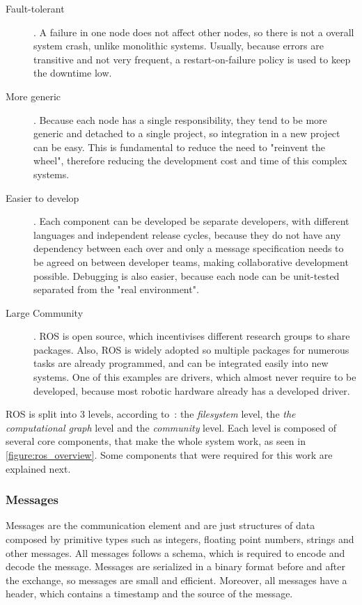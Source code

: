 \begin{description}
    \item[Fault-tolerant]. A failure in one node does not affect other nodes, so there is not a overall system crash, unlike monolithic systems. Usually, because errors are transitive and not very frequent, a restart-on-failure policy is used to keep the downtime low.
    \item[More generic]. Because each node has a single responsibility, they tend to be more generic and detached to a single project, so integration in a new project can be easy. This is fundamental to reduce the need to "reinvent the wheel", therefore reducing the development cost and time of this complex systems.
    \item[Easier to develop]. Each component can be developed be separate developers, with different languages and independent release cycles, because they do not have any dependency between each over and only a message specification needs to be agreed on between developer teams, making collaborative development possible. Debugging is also easier, because each node can be unit-tested separated from the "real environment".
    \item[Large Community]. ROS is open source, which incentivises different research groups to share packages. Also, ROS is widely adopted so multiple packages for numerous tasks are already programmed, and can be integrated easily into new systems. One of this examples are drivers, which almost never require to be developed, because most robotic hardware already has a developed driver.
\end{description}

ROS is split into 3 levels, according to~\cite{fernandez_2015}: the \textit{filesystem} level, the \textit{the computational graph} level and the \textit{community} level. Each level is composed of several core components, that make the whole system work, as seen in \cref{figure:ros_overview}. Some components that were required for this work are explained next.



\subsubsection{Messages}

Messages are the communication element and are just structures of data composed by primitive types such as integers, floating point numbers, strings and other messages. All messages follows a schema, which is required to encode and decode the message. Messages are serialized in a binary format before and after the exchange, so messages are small and efficient. Moreover, all messages have a header, which contains a timestamp and the source of the message. 

